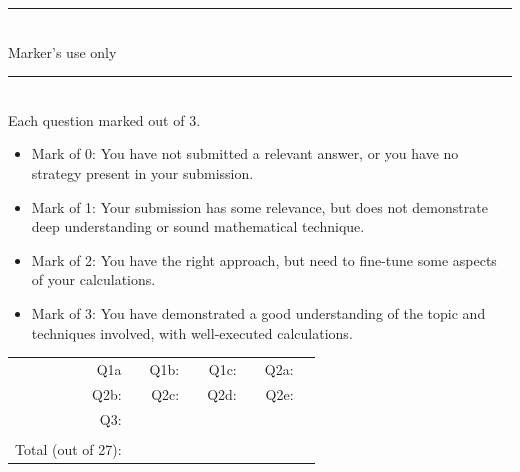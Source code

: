 \documentclass[a4paper, 11pt]{report}
\begin{document}
\hrule ${}^{}$\\
Marker's use only
\\
\hrule ${}^{}$\\
Each question marked out of 3.
\begin{itemize}
\item Mark of 0: You have not submitted a relevant answer, or you have no strategy present in your submission.\\
\item Mark of 1: Your submission has some relevance, but does not demonstrate deep understanding or sound mathematical technique. \\
\item Mark of 2: You have the right approach, but need to fine-tune some aspects of your calculations.\\
\item Mark of 3: You have demonstrated a good understanding of the topic and techniques involved, with well-executed calculations. \\ 

\end{itemize}
\begin{tabular}{rrrrrrrr}
Q1a& \hspace{2cm} & Q1b: & \hspace{2cm} & Q1c: & \hspace{2cm} & Q2a:  & \\[.5cm]
Q2b:& \hspace{2cm} & Q2c: & \hspace{2cm} & Q2d: & \hspace{2cm} & Q2e:  & \\[.5cm]
Q3: & \hspace{2cm} &  & \hspace{2cm} & & \hspace{2cm} &  & \\[.5cm]
&&&&&&& \\
Total (out of 27): &&&&&&& \\
\end{tabular}
\end{document}
